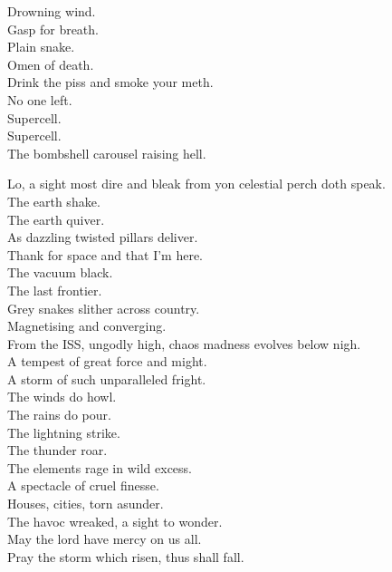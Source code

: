 Drowning wind. \\
Gasp for breath. \\
Plain snake. \\
Omen of death. \\
Drink the piss and smoke your meth. \\
No one left. \\

Supercell. \\
Supercell. \\
The bombshell carousel raising hell. \\



Lo, a sight most dire and bleak from yon celestial perch doth speak. \\
The earth shake. \\
The earth quiver. \\
As dazzling twisted pillars deliver. \\

Thank  for space and that I'm here. \\
The vacuum black. \\
The last frontier. \\
Grey snakes slither across country. \\
Magnetising and converging. \\

From the ISS, ungodly high, chaos madness evolves below nigh. \\
A tempest of great force and might. \\
A storm of such unparalleled fright. \\
The winds do howl. \\
The rains do pour. \\
The lightning strike. \\
The thunder roar. \\
The elements rage in wild excess. \\
A spectacle of cruel finesse. \\
Houses, cities, torn asunder. \\
The havoc wreaked, a sight to wonder. \\
May the lord have mercy on us all. \\
Pray the storm which risen, thus shall fall. \\

